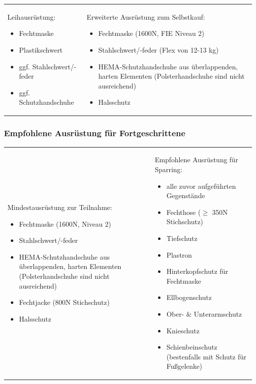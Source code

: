 \begin{longtable}{p{6.25cm}p{6.25cm}}
    Leihausrüstung:
    \begin{itemize}
        \item Fechtmaske
        \item Plastikschwert
        \item ggf. Stahlschwert/-feder
        \item ggf. Schutzhandschuhe
    \end{itemize}
    &
    Erweiterte Ausrüstung zum Selbstkauf:
    \begin{itemize}
        \item Fechtmaske (1600N, FIE Niveau 2)
        \item Stahlschwert/-feder (Flex von 12-13 kg)
        \item HEMA-Schutzhandschuhe aus überlappenden, harten Elementen (Polsterhandschuhe sind nicht ausreichend)
        \item Halsschutz
    \end{itemize}
\end{longtable}

\subsubsection*{\hspace{3.5cm}Empfohlene Ausrüstung für Fortgeschrittene}

\begin{longtable}{p{6.25cm}p{6.25cm}}
    Mindestausrüstung zur Teilnahme:
    \begin{itemize}
        \item Fechtmaske (1600N, Niveau 2)
        \item Stahlschwert/-feder
        \item HEMA-Schutzhandschuhe aus überlappenden, harten Elementen (Polsterhandschuhe sind nicht ausreichend)
        \item Fechtjacke (800N Stichschutz)
        \item Halsschutz
    \end{itemize}
    &
    Empfohlene Ausrüstung für Sparring:
    \begin{itemize}
        \item alle zuvor aufgeführten Gegenstände
        \item Fechthose ($\geq$ 350N Stichschutz)
        \item Tiefschutz
        \item Plastron
        \item Hinterkopfschutz für Fechtmaske
        \item Ellbogenschutz
        \item Ober- \& Unterarmschutz
        \item Knieschutz
        \item Schienbeinschutz (bestenfalls mit Schutz für Fußgelenke)
    \end{itemize}
\end{longtable}


